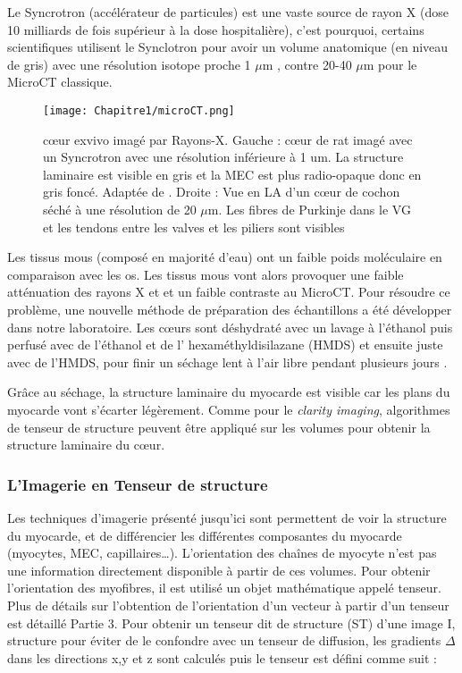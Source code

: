 Le Syncrotron (accélérateur de particules) est une vaste source de rayon X (dose 10 milliards de fois supérieur à la dose hospitalière), c’est pourquoi, certains scientifiques utilisent le Synclotron pour avoir un volume anatomique (en niveau de gris) avec une résolution isotope proche 1 $\mu$m \cite{Planinc2021}, contre 20-40 $\mu$m pour le MicroCT classique.

\begin{figure}[!htbp]
  \begin{center}
    \texttt{[image: Chapitre1/microCT.png]}
     \end{center}
    \caption{cœur exvivo imagé par Rayons-X. Gauche : cœur de rat imagé avec un Syncrotron avec une résolution inférieure à 1 um. La structure laminaire est visible en gris et la MEC est plus radio-opaque donc en gris foncé. Adaptée de \cite{Planinc2021}. Droite : Vue en LA d’un cœur de cochon séché à une résolution de 20 $\mu$m. Les fibres de Purkinje dans le VG et les tendons entre les valves et les piliers sont visibles \cite{Pallares_Lupon_2022}}
  \label{fig:uCT}
\end{figure}

Les tissus mous (composé en majorité d’eau) ont un faible poids moléculaire en comparaison avec les os. Les tissus mous vont alors provoquer une faible atténuation des rayons X et et un faible contraste au MicroCT. Pour résoudre ce problème, une nouvelle méthode de préparation des échantillons a été développer dans notre laboratoire. Les cœurs sont déshydraté avec un lavage à l’éthanol puis perfusé avec de l’éthanol et de l’ hexaméthyldisilazane (HMDS) et ensuite juste avec de l’HMDS, pour finir un séchage lent à l’air libre pendant plusieurs jours \cite{Pallares_Lupon_2022}.

Grâce au séchage, la structure laminaire du myocarde est visible car les plans du myocarde vont s’écarter légèrement. Comme pour le \textit{clarity imaging}, algorithmes de tenseur de structure peuvent être appliqué sur les volumes pour obtenir la structure laminaire du cœur.

	\subsubsection{L’Imagerie en Tenseur de structure}

Les techniques d’imagerie présenté jusqu’ici sont permettent de voir la structure du myocarde, et de différencier les différentes composantes du myocarde (myocytes, MEC, capillaires…). L’orientation des chaînes de myocyte n’est pas une information directement disponible à partir de ces volumes. Pour obtenir l’orientation des myofibres, il est utilisé un objet mathématique appelé tenseur. Plus de détails sur l’obtention de l’orientation d’un vecteur à partir d’un tenseur est détaillé Partie 3. Pour obtenir un tenseur dit de structure (ST) d’une image I, structure pour éviter de le confondre avec un tenseur de diffusion, les gradients $\Delta$ dans les directions x,y et z sont calculés puis le tenseur est défini comme suit :


